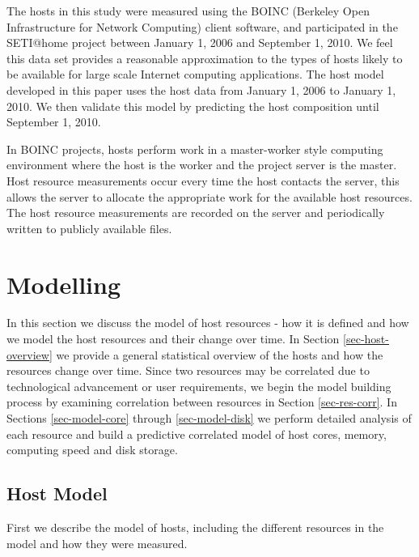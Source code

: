 \documentclass[conference]{IEEEtran}
\begin{document}
The hosts in this study were measured using the BOINC
(Berkeley Open Infrastructure for Network Computing)
\cite{Anderson:2004p59} client software, and participated in
the SETI@home project \cite{Anderson:2002p327} between
January 1, 2006 and September 1, 2010.  We feel this data
set provides a reasonable approximation to the types of
hosts likely to be available for large scale Internet
computing applications.  The host model developed in this
paper uses the host data from January 1, 2006 to January 1,
2010.  We then validate this model by predicting the host
composition until September 1, 2010.

In BOINC projects, hosts perform work in a master-worker
style computing environment where the host is the worker and
the project server is the master.  Host resource
measurements occur every time the host contacts the server,
this allows the server to allocate the appropriate work for
the available host resources.  The host resource
measurements are recorded on the server and periodically
written to publicly available files.

\section{Modelling}
\label{sec-modelling}

In this section we discuss the model of host resources - how
it is defined and how we model the host resources and their
change over time.  In Section \ref{sec-host-overview} we
provide a general statistical overview of the hosts and how
the resources change over time.  Since two
resources may be correlated due to technological advancement
or user requirements, we begin the model building process by
examining correlation between resources in Section
\ref{sec-res-corr}.  In Sections \ref{sec-model-core}
through \ref{sec-model-disk} we perform detailed analysis of
each resource and build a predictive correlated model of
host cores, memory, computing speed and disk storage.

\subsection{Host Model}

\label{sec-host-model}

First we describe the model of hosts, including the
different resources in the model and how they were measured.
\end{document}
